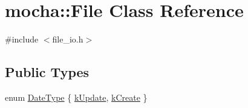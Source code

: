 \hypertarget{classmocha_1_1_file}{
\section{mocha::File Class Reference}
\label{classmocha_1_1_file}
}


{\ttfamily \#include $<$file\_\-io.h$>$}

\subsection*{Public Types}
\begin{DoxyCompactItemize}
\item 
enum \hyperlink{classmocha_1_1_file_a86110d8e8c2dfa58f84ae6617aa1fb6a}{DateType} \{ \hyperlink{classmocha_1_1_file_a86110d8e8c2dfa58f84ae6617aa1fb6aae03a7ea608ce891c3b92ee0716ed844a}{kUpdate}, 
\hyperlink{classmocha_1_1_file_a86110d8e8c2dfa58f84ae6617aa1fb6aace95f694456c939dc96b07d816b6dfb7}{kCreate}
 \}
\end{DoxyCompactItemize}
